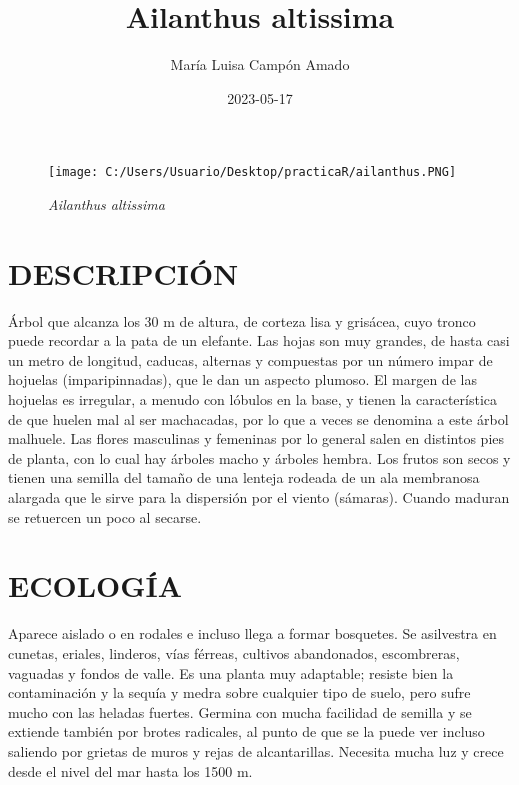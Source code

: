 \documentclass[
]{article}
\title{Ailanthus altissima}
\author{María Luisa Campón Amado}
\date{2023-05-17}
\begin{document}
\maketitle

{
\setcounter{tocdepth}{4}
\tableofcontents
}
\begin{figure}
\centering
\texttt{[image: C:/Users/Usuario/Desktop/practicaR/ailanthus.PNG]}
\caption{\emph{Ailanthus altissima}}
\end{figure}

\hypertarget{descripciuxf3n}{%
\section{\texorpdfstring{\textbf{DESCRIPCIÓN}}{DESCRIPCIÓN}}\label{descripciuxf3n}}

Árbol que alcanza los 30 m de altura, de corteza lisa y grisácea, cuyo
tronco puede recordar a la pata de un elefante. Las hojas son muy
grandes, de hasta casi un metro de longitud, caducas, alternas y
compuestas por un número impar de hojuelas (imparipinnadas), que le dan
un aspecto plumoso. El margen de las hojuelas es irregular, a menudo con
lóbulos en la base, y tienen la característica de que huelen mal al ser
machacadas, por lo que a veces se denomina a este árbol malhuele. Las
flores masculinas y femeninas por lo general salen en distintos pies de
planta, con lo cual hay árboles macho y árboles hembra. Los frutos son
secos y tienen una semilla del tamaño de una lenteja rodeada de un ala
membranosa alargada que le sirve para la dispersión por el viento
(sámaras). Cuando maduran se retuercen un poco al secarse.

\hypertarget{ecologuxeda}{%
\section{\texorpdfstring{\textbf{ECOLOGÍA}}{ECOLOGÍA}}\label{ecologuxeda}}

Aparece aislado o en rodales e incluso llega a formar bosquetes. Se
asilvestra en cunetas, eriales, linderos, vías férreas, cultivos
abandonados, escombreras, vaguadas y fondos de valle. Es una planta muy
adaptable; resiste bien la contaminación y la sequía y medra sobre
cualquier tipo de suelo, pero sufre mucho con las heladas fuertes.
Germina con mucha facilidad de semilla y se extiende también por brotes
radicales, al punto de que se la puede ver incluso saliendo por grietas
de muros y rejas de alcantarillas. Necesita mucha luz y crece desde el
nivel del mar hasta los 1500 m.
\end{document}
